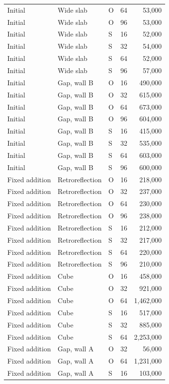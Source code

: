 {\begin{longtable}{lllrr}
Initial & Wide slab & O & 64 & 53,000\\
Initial & Wide slab & O & 96 & 53,000\\
Initial & Wide slab & S & 16 & 52,000\\
Initial & Wide slab & S & 32 & 54,000\\
Initial & Wide slab & S & 64 & 52,000\\
Initial & Wide slab & S & 96 & 57,000\\
Initial & Gap, wall B & O & 16 & 490,000\\
Initial & Gap, wall B & O & 32 & 615,000\\
Initial & Gap, wall B & O & 64 & 673,000\\
Initial & Gap, wall B & O & 96 & 604,000\\
Initial & Gap, wall B & S & 16 & 415,000\\
Initial & Gap, wall B & S & 32 & 535,000\\
Initial & Gap, wall B & S & 64 & 603,000\\
Initial & Gap, wall B & S & 96 & 600,000\\
Fixed addition & Retroreflection & O & 16 & 218,000\\
Fixed addition & Retroreflection & O & 32 & 237,000\\
Fixed addition & Retroreflection & O & 64 & 230,000\\
Fixed addition & Retroreflection & O & 96 & 238,000\\
Fixed addition & Retroreflection & S & 16 & 212,000\\
Fixed addition & Retroreflection & S & 32 & 217,000\\
Fixed addition & Retroreflection & S & 64 & 220,000\\
Fixed addition & Retroreflection & S & 96 & 210,000\\
Fixed addition & Cube & O & 16 & 458,000\\
Fixed addition & Cube & O & 32 & 921,000\\
Fixed addition & Cube & O & 64 & 1,462,000\\
Fixed addition & Cube & S & 16 & 517,000\\
Fixed addition & Cube & S & 32 & 885,000\\
Fixed addition & Cube & S & 64 & 2,253,000\\
Fixed addition & Gap, wall A & O & 32 & 56,000\\
Fixed addition & Gap, wall A & O & 64 & 1,231,000\\
Fixed addition & Gap, wall A & S & 16 & 103,000\\

\end{longtable}}
